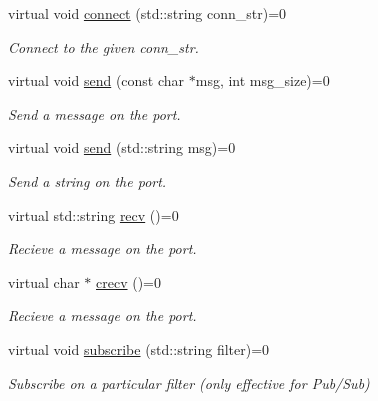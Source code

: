 \begin{DoxyCompactItemize}
\item 
virtual void \hyperlink{classZmqOut_ae34b1742c72e0c82ea42315cb68f1a20}{connect} (std\+::string conn\+\_\+str)=0\hypertarget{classZmqOut_ae34b1742c72e0c82ea42315cb68f1a20}{}\label{classZmqOut_ae34b1742c72e0c82ea42315cb68f1a20}

\begin{DoxyCompactList}\small\item\em Connect to the given conn\+\_\+str. \end{DoxyCompactList}\item 
virtual void \hyperlink{classZmqOut_a97935d9e7cbacd2fcb9655433e4b7af4}{send} (const char $\ast$msg, int msg\+\_\+size)=0\hypertarget{classZmqOut_a97935d9e7cbacd2fcb9655433e4b7af4}{}\label{classZmqOut_a97935d9e7cbacd2fcb9655433e4b7af4}

\begin{DoxyCompactList}\small\item\em Send a message on the port. \end{DoxyCompactList}\item 
virtual void \hyperlink{classZmqOut_ac7b314ddf6e0357c31b05fb2b1b91635}{send} (std\+::string msg)=0\hypertarget{classZmqOut_ac7b314ddf6e0357c31b05fb2b1b91635}{}\label{classZmqOut_ac7b314ddf6e0357c31b05fb2b1b91635}

\begin{DoxyCompactList}\small\item\em Send a string on the port. \end{DoxyCompactList}\item 
virtual std\+::string \hyperlink{classZmqOut_a02da5e5dd51f99e7d35a3f843b9bd00e}{recv} ()=0\hypertarget{classZmqOut_a02da5e5dd51f99e7d35a3f843b9bd00e}{}\label{classZmqOut_a02da5e5dd51f99e7d35a3f843b9bd00e}

\begin{DoxyCompactList}\small\item\em Recieve a message on the port. \end{DoxyCompactList}\item 
virtual char $\ast$ \hyperlink{classZmqOut_ab2f09b3e006ab0080f3c54b0ccd8ae1d}{crecv} ()=0\hypertarget{classZmqOut_ab2f09b3e006ab0080f3c54b0ccd8ae1d}{}\label{classZmqOut_ab2f09b3e006ab0080f3c54b0ccd8ae1d}

\begin{DoxyCompactList}\small\item\em Recieve a message on the port. \end{DoxyCompactList}\item 
virtual void \hyperlink{classZmqOut_a1183a7e64e76deaa0262cb1fc7853af5}{subscribe} (std\+::string filter)=0\hypertarget{classZmqOut_a1183a7e64e76deaa0262cb1fc7853af5}{}\label{classZmqOut_a1183a7e64e76deaa0262cb1fc7853af5}

\begin{DoxyCompactList}\small\item\em Subscribe on a particular filter (only effective for Pub/\+Sub) \end{DoxyCompactList}\end{DoxyCompactItemize}


